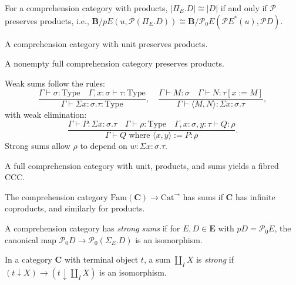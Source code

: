 \documentclass{article}
\begin{document}
\begin{lemma}
\label{lem:5.2}
For a comprehension category with products, $|\Pi_E . D| \cong |D|$ if and only if $\mathscr{P}$ preserves products, i.e., $\mathbf{B}/p E(u, \mathscr{P}(\Pi_E . D)) \cong \mathbf{B}/\mathscr{P}_0 E(\mathscr{P} E^*(u), \mathscr{P} D)$.
\end{lemma}

\begin{lemma}
\label{lem:5.3}
A comprehension category with unit preserves products.
\end{lemma}

\begin{lemma}
\label{lem:5.4}
A nonempty full comprehension category preserves products.
\end{lemma}

\begin{definition}
\label{def:5.5}
Weak sums follow the rules:
\[
\frac{\Gamma \vdash \sigma : \text{Type} \quad \Gamma, x : \sigma \vdash \tau : \text{Type}}{\Gamma \vdash \Sigma x : \sigma . \tau : \text{Type}}, \quad \frac{\Gamma \vdash M : \sigma \quad \Gamma \vdash N : \tau[x := M]}{\Gamma \vdash \langle M, N \rangle : \Sigma x : \sigma . \tau},
\]
with weak elimination:
\[
\frac{\Gamma \vdash P : \Sigma x : \sigma . \tau \quad \Gamma \vdash \rho : \text{Type} \quad \Gamma, x : \sigma, y : \tau \vdash Q : \rho}{\Gamma \vdash Q \text{ where } \langle x, y \rangle := P : \rho}.
\]
Strong sums allow $\rho$ to depend on $w : \Sigma x : \sigma . \tau$.
\end{definition}

\begin{lemma}
\label{lem:5.6}
A full comprehension category with unit, products, and sums yields a fibred CCC.
\end{lemma}

\begin{lemma}
\label{lem:5.7}
The comprehension category $\text{Fam}(\mathbf{C}) \to \text{Cat}^{\to}$ has sums if $\mathbf{C}$ has infinite coproducts, and similarly for products.
\end{lemma}

\begin{definition}
\label{def:5.8}
A comprehension category has \emph{strong sums} if for $E, D \in \mathbf{E}$ with $p D = \mathscr{P}_0 E$, the canonical map $\mathscr{P}_0 D \to \mathscr{P}_0 (\Sigma_E . D)$ is an isomorphism.
\end{definition}

\begin{definition}
\label{def:5.9}
In a category $\mathbf{C}$ with terminal object $t$, a sum $\amalg_I X$ is \emph{strong} if $(t \downarrow X) \to (t \downarrow \amalg_I X)$ is an isomorphism.
\end{definition}
\end{document}
